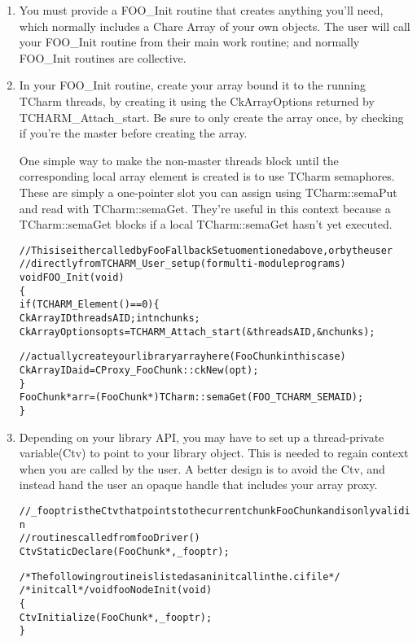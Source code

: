 \documentclass[10pt]{article}
\begin{document}
\begin{enumerate}
\item You must provide a FOO\_Init routine that creates anything
you'll need, which normally includes a Chare Array of your own
objects.  The user will call your FOO\_Init routine
from their main work routine; and normally FOO\_Init routines 
are collective.

\item In your FOO\_Init routine, create your array bound it to the 
running TCharm threads, by creating it using the CkArrayOptions 
returned by TCHARM\_Attach\_start.  Be sure to only create the 
array once, by checking if you're the master before creating the
array.  

One simple way to make the non-master threads block until the corresponding
local array element is created is to use TCharm semaphores.  
These are simply a one-pointer slot you can assign using TCharm::semaPut
and read with TCharm::semaGet.  They're useful in this context
because a TCharm::semaGet blocks if a local TCharm::semaGet hasn't
yet executed.  

\begin{alltt}
//This is either called by FooFallbackSetuo mentioned above, or by the user
//directly from TCHARM\_User\_setup (for multi-module programs)
void FOO\_Init(void)
\{
  if (TCHARM\_Element()==0) \{
    CkArrayID threadsAID; int nchunks;
    CkArrayOptions opts=TCHARM\_Attach\_start(&threadsAID,&nchunks);
  
  //actually create your library array here (FooChunk in this case)
    CkArrayID aid = CProxy\_FooChunk::ckNew(opt);
  \}
  FooChunk *arr=(FooChunk *)TCharm::semaGet(FOO_TCHARM_SEMAID);
\}
\end{alltt}

\item Depending on your library API, you may have to
set up a thread-private variable(Ctv) to point to your library object. 
This is needed to regain context when you are called by the user.
A better design is to avoid the Ctv, and instead hand the user 
an opaque handle that includes your array proxy.

\begin{alltt}
//\_fooptr is the Ctv that points to the current chunk FooChunk and is only valid in 
//routines called from fooDriver()
CtvStaticDeclare(FooChunk *, \_fooptr);

/* The following routine is listed as an initcall in the .ci file */
/*initcall*/ void fooNodeInit(void)
\{
  CtvInitialize(FooChunk*, \_fooptr);
\}
\end{alltt}


\end{enumerate}
\end{document}
